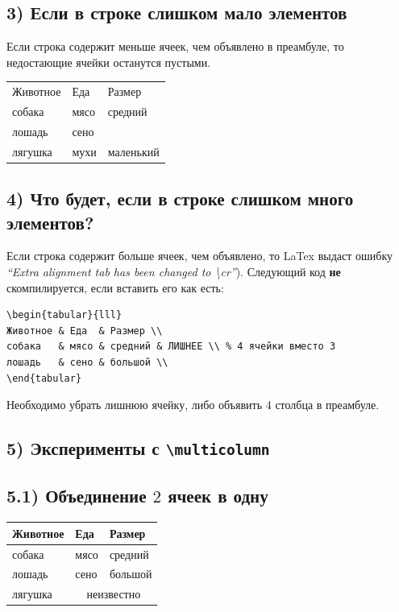 \documentclass{article}
\begin{document}
\bigskip

\subsection*{3) Если в строке слишком мало элементов}
\noindent Если строка содержит меньше ячеек, чем объявлено в преамбуле, то недостающие ячейки останутся пустыми.

\medskip
\begin{tabular}{lll}
Животное & Еда  & Размер \\
собака   & мясо & средний \\
лошадь   & сено &  \\
лягушка  & мухи & маленький \\
\end{tabular}

\bigskip

\subsection*{4) Что будет, если в строке слишком много элементов?}
\noindent Если строка содержит больше ячеек, чем объявлено, то LaTex выдаст ошибку \emph{``Extra alignment tab has been changed to \textbackslash cr''}). Следующий код
\textbf{не} скомпилируется, если вставить его как есть:

\medskip
\begin{verbatim}
\begin{tabular}{lll}
Животное & Еда  & Размер \\
собака   & мясо & средний & ЛИШНЕЕ \\ % 4 ячейки вместо 3
лошадь   & сено & большой \\
\end{tabular}
\end{verbatim}

\noindent Необходимо убрать лишнюю ячейку, либо объявить 4 столбца в преамбуле. 

\bigskip

\subsection*{5) Эксперименты с \texttt{\textbackslash multicolumn}}
\subsection*{5.1) Объединение \(2\) ячеек в одну}

\begin{tabular}{lll}
\toprule
Животное & Еда  & Размер \\
\midrule
собака   & мясо & средний \\
лошадь   & сено & большой \\
лягушка  &\multicolumn{2}{c}{неизвестно} \\
\bottomrule
\end{tabular}
\end{document}
